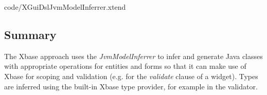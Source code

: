 	{code/XGuiDslJvmModelInferrer.xtend}

\subsection{Summary}
The Xbase approach uses the \emph{JvmModelInferrer} to infer and generate Java
classes with appropriate operations for entities and forms so that it can make
use of Xbase for scoping and validation (e.g. for the \emph{validate} clause of
a widget). Types are inferred using the built-in Xbase type provider, for
example in the validator.
